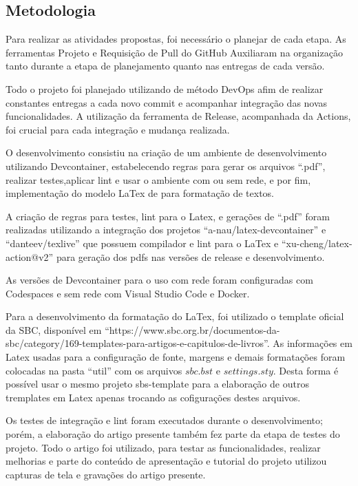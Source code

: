 \subsection{Metodologia}

Para realizar as atividades propostas, foi necessário o planejar de cada etapa. As ferramentas Projeto e Requisição de Pull do GitHub Auxiliaram na organização tanto durante a etapa de planejamento quanto nas entregas de cada versão.

Todo o projeto foi planejado utilizando de método DevOps afim de realizar constantes entregas a cada novo commit e acompanhar integração das novas funcionalidades. A utilização da ferramenta de Release, acompanhada da Actions, foi crucial para cada integração e mudança realizada.

O desenvolvimento consistiu na criação de um ambiente de desenvolvimento utilizando Devcontainer, estabelecendo regras para gerar os arquivos ``.pdf'', realizar testes,aplicar lint e usar o ambiente com ou sem rede, e por fim, implementação do modelo LaTex de para formatação de textos.


A criação de regras para testes, lint para o Latex, e gerações de ``.pdf'' foram realizadas utilizando a integração dos projetos ``a-nau/latex-devcontainer'' e ``danteev/texlive'' que possuem compilador e lint para o LaTex e ``xu-cheng/latex-action@v2'' para geração dos pdfs nas versões de release e desenvolvimento.

As versões de Devcontainer para o uso com rede foram configuradas com Codespaces e sem rede com Visual Studio Code e Docker.

Para a desenvolvimento da formatação do LaTex, foi utilizado o template oficial da SBC, disponível em ``https://www.sbc.org.br/documentos-da-sbc/category/169-templates-para-artigos-e-capitulos-de-livros''. As informações em Latex usadas para a configuração de fonte, margens e demais formatações foram colocadas na pasta ``util'' com os arquivos $sbc.bst$ e $settings.sty$. Desta forma é possível usar o mesmo projeto sbs-template para a elaboração de outros tremplates em Latex apenas trocando as cofigurações destes arquivos.

Os testes de integração e lint foram executados durante o desenvolvimento; porém, a elaboração do artigo presente também fez parte da etapa de testes do projeto. Todo o artigo foi utilizado, para testar as funcionalidades, realizar melhorias e parte do conteúdo de apresentação e tutorial do projeto utilizou capturas de tela e gravações do artigo presente.